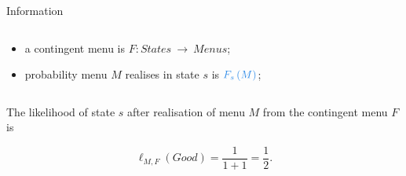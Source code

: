 \documentclass[usenames,dvipsnames,aspectratio=169,11pt, envcountsect, handout]{beamer}
\begin{document}
\begin{frame}{Information}
\begin{columns}
		\begin{column}{0.65\textwidth} %
			\begin{itemize}
				\item a contingent menu is \(F: States \: \rightarrow \: Menus \);
				\item probability menu \( M \) realises in state \( s \) is \( \textcolor{blue}{F_s \left( M \right)} \); \pause
			\end{itemize}
		\end{column}
	\end{columns}

	\vspace{0.6cm}

	The likelihood of state \(s\) after realisation of menu \(M\) from the contingent menu \(F\) is

	\vfill

	\[ \ell_{M, F} \left( Good \right) = \frac{1}{1+1} = \frac{1}{2} .
	\]

\end{frame}
\end{document}
